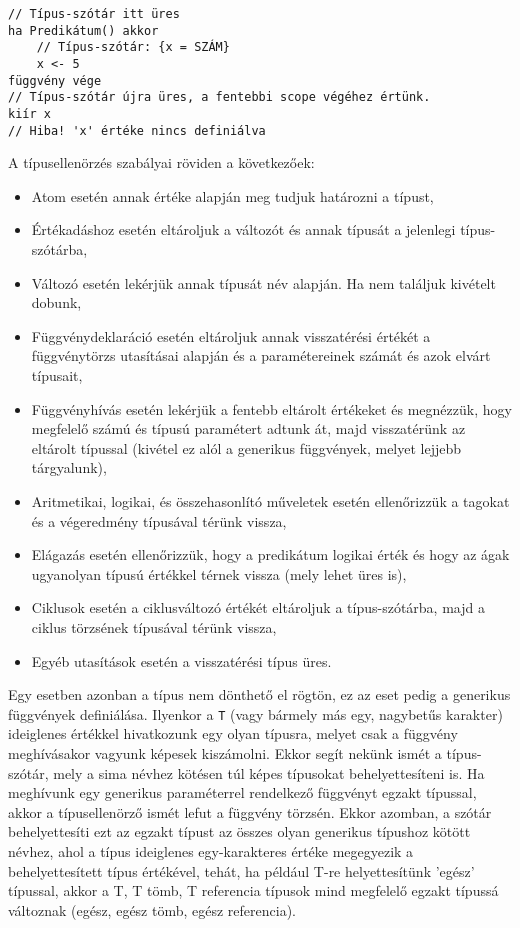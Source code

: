 \begin{verbatim}
// Típus-szótár itt üres
ha Predikátum() akkor
    // Típus-szótár: {x = SZÁM}
    x <- 5
függvény vége
// Típus-szótár újra üres, a fentebbi scope végéhez értünk.
kiír x
// Hiba! 'x' értéke nincs definiálva
\end{verbatim}

A típusellenörzés szabályai röviden a következőek:

\begin{itemize}
    \item Atom esetén annak értéke alapján meg tudjuk határozni a típust,
    \item Értékadáshoz esetén eltároljuk a változót és annak típusát a jelenlegi típus-szótárba,
    \item Változó esetén lekérjük annak típusát név alapján. Ha nem találjuk kivételt dobunk,
    \item Függvénydeklaráció esetén eltároljuk annak visszatérési értékét a függvénytörzs utasításai alapján és a paramétereinek számát és azok elvárt típusait,
    \item Függvényhívás esetén lekérjük a fentebb eltárolt értékeket és megnézzük, hogy megfelelő számú és típusú paramétert adtunk át, majd visszatérünk az eltárolt típussal (kivétel ez alól a generikus függvények, melyet lejjebb tárgyalunk),
    \item Aritmetikai, logikai, és összehasonlító műveletek esetén ellenőrizzük a tagokat és a végeredmény típusával térünk vissza,
    \item Elágazás esetén ellenőrizzük, hogy a predikátum logikai érték és hogy az ágak ugyanolyan típusú értékkel térnek vissza (mely lehet üres is),
    \item Ciklusok esetén a ciklusváltozó értékét eltároljuk a típus-szótárba, majd a ciklus törzsének típusával térünk vissza,
    \item Egyéb utasítások esetén a visszatérési típus üres. 
\end{itemize}

Egy esetben azonban a típus nem dönthető el rögtön, ez az eset pedig a generikus függvények definiálása. Ilyenkor a \texttt{T} (vagy bármely más egy, nagybetűs karakter) ideiglenes értékkel hivatkozunk egy olyan típusra, melyet csak a függvény meghívásakor vagyunk képesek kiszámolni. Ekkor segít nekünk ismét a típus-szótár, mely a sima névhez kötésen túl képes típusokat behelyettesíteni is. Ha meghívunk egy generikus paraméterrel rendelkező függvényt egzakt típussal, akkor a típusellenörző ismét lefut a függvény törzsén. Ekkor azomban, a szótár behelyettesíti ezt az egzakt típust az összes olyan generikus típushoz kötött névhez, ahol a típus ideiglenes egy-karakteres értéke megegyezik a behelyettesített típus értékével, tehát, ha például T-re helyettesítünk 'egész' típussal, akkor a T, T tömb, T referencia típusok mind megfelelő egzakt típussá változnak (egész, egész tömb, egész referencia).


